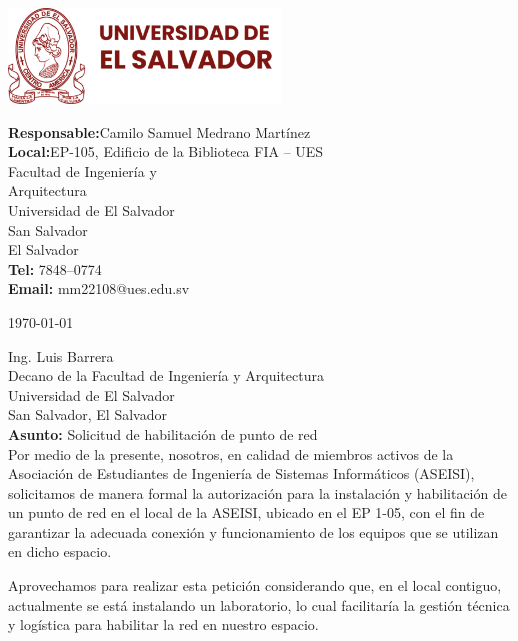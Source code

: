 \documentclass[12pt, a4paper]{letter} %
\begin{document}
\begin{minipage}{0.6\textwidth}
\includegraphics[height=1in]{Logos/ues-logo.png}
\end{minipage}
\hfill
\begin{minipage}{0.4\textwidth}\raggedright
\small{\textbf{\color{umdred}Responsable:}\hphantom{A}Camilo Samuel Medrano Martínez\\
\textbf{\color{umdred}Local:}\hphantom{A}EP-105, Edificio de la Biblioteca FIA -- UES\\
\hphantom{AA}Facultad de Ingeniería y\\
\hphantom{AA}Arquitectura\\
\hphantom{AA}Universidad de El Salvador\\
\hphantom{AA}San Salvador\\
\hphantom{AA}El Salvador\\
\textbf{\color{umdred}Tel: } 7848--0774\\
\textbf{\color{umdred}Email: }mm22108@ues.edu.sv }
\end{minipage}

\today

Ing. Luis Barrera\\
Decano de la Facultad de Ingeniería y Arquitectura\\
Universidad de El Salvador\\
San Salvador, El Salvador\\

\textbf{Asunto:} Solicitud de habilitación de punto de red\\

Por medio de la presente, nosotros, en calidad de miembros activos de la Asociación de Estudiantes de Ingeniería de Sistemas Informáticos (ASEISI), solicitamos de manera formal la autorización para la instalación y habilitación de un punto de red en el local de la ASEISI, ubicado en el EP 1-05, con el fin de garantizar la adecuada conexión y funcionamiento de los equipos que se utilizan en dicho espacio.

Aprovechamos para realizar esta petición considerando que, en el local contiguo, actualmente se está instalando un laboratorio, lo cual facilitaría la gestión técnica y logística para habilitar la red en nuestro espacio.
\end{document}
